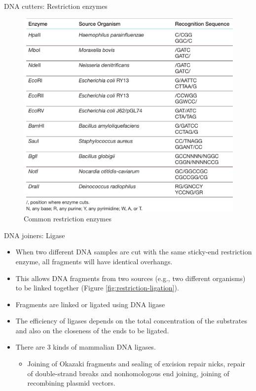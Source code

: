 \documentclass[
  ignorenonframetext,
  aspectratio=169]{beamer}
\providecommand{\tightlist}{%
  \setlength{\itemsep}{0pt}\setlength{\parskip}{0pt}}
\begin{document}
\begin{frame}{DNA cutters: Restriction enzymes}
\protect\hypertarget{dna-cutters-restriction-enzymes-3}{}
\begin{figure}
\includegraphics[width=0.5\linewidth]{./../images/restriction_enzymes_ex} \caption{Common restriction enzymes}\label{fig:restriction-enzymes-ex}
\end{figure}
\end{frame}

\begin{frame}{DNA joiners: Ligase}
\protect\hypertarget{dna-joiners-ligase}{}
\begin{itemize}
\tightlist
\item
  When two different DNA samples are cut with the same sticky-end
  restriction enzyme, all fragments will have identical overhangs.
\item
  This allows DNA fragments from two sources (e.g., two different
  organisms) to be linked together (Figure
  \ref{fig:restriction-ligation}).
\item
  Fragments are linked or ligated using DNA ligase
\item
  The efficiency of ligases depends on the total concentration of the
  substrates and also on the closeness of the ends to be ligated.
\item
  There are 3 kinds of mammalian DNA ligases.

  \begin{itemize}
  \tightlist
  \item
    Joining of Okazaki fragments and sealing of excision repair nicks,
    repair of double-strand breaks and nonhomologous end joining,
    joining of recombining plasmid vectors.
  \end{itemize}
\end{itemize}
\end{frame}
\end{document}
